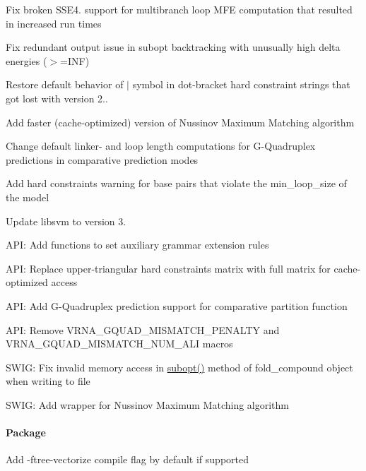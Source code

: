 \begin{DoxyItemize}
\item Fix broken S\+S\+E4. support for multibranch loop M\+FE computation that resulted in increased run times
\item Fix redundant output issue in subopt backtracking with unusually high delta energies ($>$=I\+NF)
\item Restore default behavior of \textquotesingle{}$\vert$\textquotesingle{} symbol in dot-\/bracket hard constraint strings that got lost with version 2..
\item Add faster (cache-\/optimized) version of Nussinov Maximum Matching algorithm
\item Change default linker-\/ and loop length computations for G-\/\+Quadruplex predictions in comparative prediction modes
\item Add hard constraints warning for base pairs that violate the {\ttfamily min\+\_\+loop\+\_\+size} of the model
\item Update {\ttfamily libsvm} to version 3.
\item A\+PI\+: Add functions to set auxiliary grammar extension rules
\item A\+PI\+: Replace upper-\/triangular hard constraints matrix with full matrix for cache-\/optimized access
\item A\+PI\+: Add G-\/\+Quadruplex prediction support for comparative partition function
\item A\+PI\+: Remove {\ttfamily V\+R\+N\+A\+\_\+\+G\+Q\+U\+A\+D\+\_\+\+M\+I\+S\+M\+A\+T\+C\+H\+\_\+\+P\+E\+N\+A\+L\+TY} and {\ttfamily V\+R\+N\+A\+\_\+\+G\+Q\+U\+A\+D\+\_\+\+M\+I\+S\+M\+A\+T\+C\+H\+\_\+\+N\+U\+M\+\_\+\+A\+LI} macros
\item S\+W\+IG\+: Fix invalid memory access in {\ttfamily \mbox{\hyperlink{group__subopt__wuchty_ga700f662506a233e42dd7fda74fafd40e}{subopt()}}} method of fold\+\_\+compound object when writing to file
\item S\+W\+IG\+: Add wrapper for Nussinov Maximum Matching algorithm
\end{DoxyItemize}

\paragraph*{Package}


\begin{DoxyItemize}
\item Add {\ttfamily -\/ftree-\/vectorize} compile flag by default if supported
\end{DoxyItemize}

